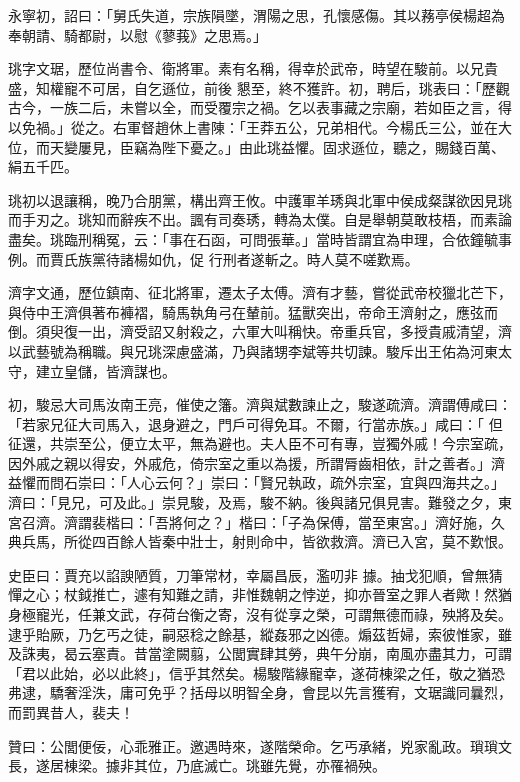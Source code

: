\begin{pinyinscope}
 永寧初，詔曰：「舅氏失道，宗族隕墜，渭陽之思，孔懷感傷。其以蓩亭侯楊超為奉朝請、騎都尉，以慰《蓼莪》之思焉。」



 珧字文琚，歷位尚書令、衛將軍。素有名稱，得幸於武帝，時望在駿前。以兄貴盛，知權寵不可居，自乞遜位，前後
 懇至，終不獲許。初，聘后，珧表曰：「歷觀古今，一族二后，未嘗以全，而受覆宗之禍。乞以表事藏之宗廟，若如臣之言，得以免禍。」從之。右軍督趙休上書陳：「王莽五公，兄弟相代。今楊氏三公，並在大位，而天變屢見，臣竊為陛下憂之。」由此珧益懼。固求遜位，聽之，賜錢百萬、絹五千匹。



 珧初以退讓稱，晚乃合朋黨，構出齊王攸。中護軍羊琇與北軍中侯成粲謀欲因見珧而手刃之。珧知而辭疾不出。諷有司奏琇，轉為太僕。自是舉朝莫敢枝梧，而素論盡矣。珧臨刑稱冤，云：「事在石函，可問張華。」當時皆謂宜為申理，合依鐘毓事例。而賈氏族黨待諸楊如仇，促
 行刑者遂斬之。時人莫不嗟歎焉。



 濟字文通，歷位鎮南、征北將軍，遷太子太傅。濟有才藝，嘗從武帝校獵北芒下，與侍中王濟俱著布褲褶，騎馬執角弓在輦前。猛獸突出，帝命王濟射之，應弦而倒。須臾復一出，濟受詔又射殺之，六軍大叫稱快。帝重兵官，多授貴戚清望，濟以武藝號為稱職。與兄珧深慮盛滿，乃與諸甥李斌等共切諫。駿斥出王佑為河東太守，建立皇儲，皆濟謀也。



 初，駿忌大司馬汝南王亮，催使之籓。濟與斌數諫止之，駿遂疏濟。濟謂傅咸曰：「若家兄征大司馬入，退身避之，門戶可得免耳。不爾，行當赤族。」咸曰：「
 但征還，共崇至公，便立太平，無為避也。夫人臣不可有專，豈獨外戚！今宗室疏，因外戚之親以得安，外戚危，倚宗室之重以為援，所謂脣齒相依，計之善者。」濟益懼而問石崇曰：「人心云何？」崇曰：「賢兄執政，疏外宗室，宜與四海共之。」濟曰：「見兄，可及此。」崇見駿，及焉，駿不納。後與諸兄俱見害。難發之夕，東宮召濟。濟謂裴楷曰：「吾將何之？」楷曰：「子為保傅，當至東宮。」濟好施，久典兵馬，所從四百餘人皆秦中壯士，射則命中，皆欲救濟。濟已入宮，莫不歎恨。



 史臣曰：賈充以諂諛陋質，刀筆常材，幸屬昌辰，濫叨非
 據。抽戈犯順，曾無猜憚之心；杖鉞推亡，遽有知難之請，非惟魏朝之悖逆，抑亦晉室之罪人者歟！然猶身極寵光，任兼文武，存荷台衡之寄，沒有從享之榮，可謂無德而祿，殃將及矣。逮乎貽厥，乃乞丐之徒，嗣惡稔之餘基，縱姦邪之凶德。煽茲哲婦，索彼惟家，雖及誅夷，曷云塞責。昔當塗闕翦，公閭實肆其勞，典午分崩，南風亦盡其力，可謂「君以此始，必以此終」，信乎其然矣。楊駿階緣寵幸，遂荷棟梁之任，敬之猶恐弗逮，驕奢淫泆，庸可免乎？括母以明智全身，會昆以先言獲宥，文琚識同曩烈，而罰異昔人，裴夫！



 贊曰：公閭便佞，心乖雅正。邀遇時來，遂階榮命。乞丐承緒，兇家亂政。瑣瑣文長，遂居棟梁。據非其位，乃底滅亡。珧雖先覺，亦罹禍殃。



\end{pinyinscope}